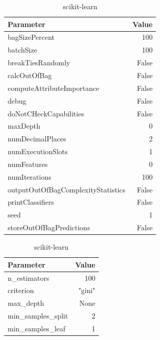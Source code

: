 \begin{table}[H]
    \footnotesize
    \centering
    \caption{Random Forest classifier used parameters in Weka and scikit-learn} \label{tab:rf_param}
    \begin{subtable}[t]{.5\linewidth}
        \caption{Weka \cite{noauthor_randomforest_nodate}}
        \centering
        \begin{tabular}{lr}\toprule
            Parameter & Value \\\midrule
            bagSizePercent & 100\\
            batchSize & 100 \\
            breakTiesRandomly & False \\
            calcOutOfBag & False \\
            computeAttributeImportance & False \\
            debug & False \\
            doNotCHeckCapabilities & False \\
            maxDepth & 0 \\
            numDecimalPlaces & 2 \\
            numExecutionSlots & 1 \\
            numFeatures & 0 \\
            numIterations & 100 \\
            outputOutOfBagComplexityStatistics & False \\
            printClassifiers & False \\
            seed & 1 \\
            storeOutOfBagPredictions & False \\\bottomrule
        \end{tabular}
    \end{subtable}%
    \begin{subtable}[t]{.5\linewidth}
        \caption{scikit-learn \cite{noauthor_sklearnensemblerandomforestclassifier_nodate}}
        \centering
        \begin{tabular}{lr}\toprule
            Parameter & Value \\\midrule
            n\_estimators & 100 \\
            criterion & "gini" \\
            max\_depth & None \\
            min\_samples\_split & 2 \\
            min\_samples\_leaf & 1 \\

\end{tabular}
\end{subtable}
\end{table}
